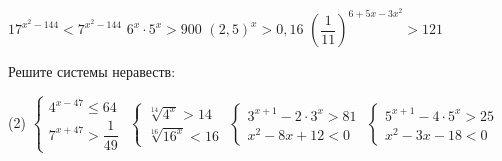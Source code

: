 \begin{class}[number=7]
\begin{listofex}
\begin{tasks}
			\task \( 17^{x^2-144}<7^{x^2-144} \)
			\task \( 6^x \cdot 5^x > 900 \)
			\task \( (2,5)^x > 0,16 \)
			\task \( \left( \dfrac{1}{11} \right)^{6+5x-3x^2} > 121 \)
		\end{tasks}
		\item Решите системы неравеств:
		\begin{tasks}(2)
			\task \( \begin{cases} 4^{x-47} \le 64 \\ 7^{x+47} > \dfrac{1}{49} \end{cases} \)
			\task \( \begin{cases} \sqrt[14]{4^x}>14 \\ \sqrt[16]{16^x}<16 \end{cases} \)
			\task \( \begin{cases} 3^{x+1}-2 \cdot 3^x > 81 \\ x^2-8x+12 < 0 \end{cases} \)
			\task \( \begin{cases} 5^{x+1} - 4 \cdot 5^x > 25 \\ x^2-3x-18 < 0 \end{cases} \)
		\end{tasks}
		
	\end{listofex}
\end{class}
	
